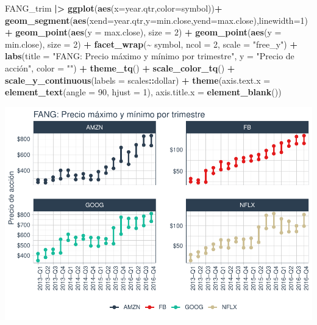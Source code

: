 \documentclass[
]{book}
\newenvironment{Shaded}{\begin{snugshade}}{\end{snugshade}}
\newcommand{\AttributeTok}[1]{\textcolor[rgb]{0.13,0.29,0.53}{#1}}
\newcommand{\DecValTok}[1]{\textcolor[rgb]{0.00,0.00,0.81}{#1}}
\newcommand{\FunctionTok}[1]{\textcolor[rgb]{0.13,0.29,0.53}{\textbf{#1}}}
\newcommand{\NormalTok}[1]{#1}
\newcommand{\SpecialCharTok}[1]{\textcolor[rgb]{0.81,0.36,0.00}{\textbf{#1}}}
\newcommand{\StringTok}[1]{\textcolor[rgb]{0.31,0.60,0.02}{#1}}
\begin{document}
\begin{Shaded}
\begin{Highlighting}[]
\NormalTok{FANG\_trim }\SpecialCharTok{|\textgreater{}} \FunctionTok{ggplot}\NormalTok{(}\FunctionTok{aes}\NormalTok{(}\AttributeTok{x=}\NormalTok{year.qtr,}\AttributeTok{color=}\NormalTok{symbol))}\SpecialCharTok{+}
             \FunctionTok{geom\_segment}\NormalTok{(}\FunctionTok{aes}\NormalTok{(}\AttributeTok{xend=}\NormalTok{year.qtr,}\AttributeTok{y=}\NormalTok{min.close,}\AttributeTok{yend=}\NormalTok{max.close),}\AttributeTok{linewidth=}\DecValTok{1}\NormalTok{)}\SpecialCharTok{+}
             \FunctionTok{geom\_point}\NormalTok{(}\FunctionTok{aes}\NormalTok{(}\AttributeTok{y =}\NormalTok{ max.close), }\AttributeTok{size =} \DecValTok{2}\NormalTok{) }\SpecialCharTok{+}
             \FunctionTok{geom\_point}\NormalTok{(}\FunctionTok{aes}\NormalTok{(}\AttributeTok{y =}\NormalTok{ min.close), }\AttributeTok{size =} \DecValTok{2}\NormalTok{) }\SpecialCharTok{+}
             \FunctionTok{facet\_wrap}\NormalTok{(}\SpecialCharTok{\textasciitilde{}}\NormalTok{ symbol, }\AttributeTok{ncol =} \DecValTok{2}\NormalTok{, }\AttributeTok{scale =} \StringTok{"free\_y"}\NormalTok{) }\SpecialCharTok{+}
             \FunctionTok{labs}\NormalTok{(}\AttributeTok{title =} \StringTok{"FANG: Precio máximo y mínimo por trimestre"}\NormalTok{,}
         \AttributeTok{y =} \StringTok{"Precio de acción"}\NormalTok{, }\AttributeTok{color =} \StringTok{""}\NormalTok{) }\SpecialCharTok{+}
             \FunctionTok{theme\_tq}\NormalTok{() }\SpecialCharTok{+}
             \FunctionTok{scale\_color\_tq}\NormalTok{() }\SpecialCharTok{+}
             \FunctionTok{scale\_y\_continuous}\NormalTok{(}\AttributeTok{labels =}\NormalTok{ scales}\SpecialCharTok{::}\NormalTok{dollar) }\SpecialCharTok{+}
             \FunctionTok{theme}\NormalTok{(}\AttributeTok{axis.text.x =} \FunctionTok{element\_text}\NormalTok{(}\AttributeTok{angle =} \DecValTok{90}\NormalTok{, }\AttributeTok{hjust =} \DecValTok{1}\NormalTok{),}
             \AttributeTok{axis.title.x =} \FunctionTok{element\_blank}\NormalTok{())}
\end{Highlighting}
\end{Shaded}

\includegraphics{Libro_TidyQualityTools_files/figure-latex/unnamed-chunk-70-1.pdf}
\end{document}
